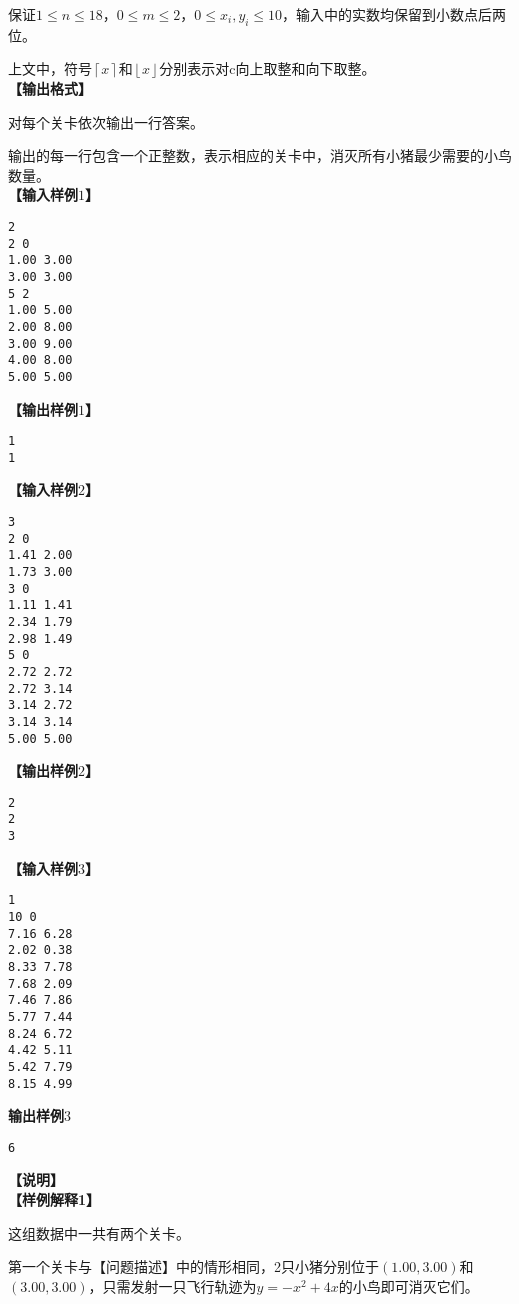 \begin{example}
保证$1\leq n\leq 18，0\leq m\leq 2，0\leq x_i,y_i\leq 10$，输入中的实数均保留到小数点后两位。

上文中，符号$\left \lceil x \right \rceil$和$\left \lfloor x \right \rfloor$分别表示对c向上取整和向下取整。\\
\textbf{【输出格式】}

对每个关卡依次输出一行答案。

输出的每一行包含一个正整数，表示相应的关卡中，消灭所有小猪最少需要的小鸟数量。\\
\textbf{【输入样例$1$】}
\begin{verbatim}
2
2 0
1.00 3.00
3.00 3.00
5 2
1.00 5.00
2.00 8.00
3.00 9.00
4.00 8.00
5.00 5.00
\end{verbatim}
\textbf{【输出样例$1$】}
\begin{verbatim}
1
1
\end{verbatim}
\textbf{【输入样例$2$】}
\begin{verbatim}
3
2 0
1.41 2.00
1.73 3.00
3 0
1.11 1.41
2.34 1.79
2.98 1.49
5 0
2.72 2.72
2.72 3.14
3.14 2.72
3.14 3.14
5.00 5.00
\end{verbatim}
\textbf{【输出样例$2$】}
\begin{verbatim}
2
2
3
\end{verbatim}
\textbf{【输入样例$3$】}
\begin{verbatim}
1
10 0
7.16 6.28
2.02 0.38
8.33 7.78
7.68 2.09
7.46 7.86
5.77 7.44
8.24 6.72
4.42 5.11
5.42 7.79
8.15 4.99
\end{verbatim}
\textbf{输出样例$3$}
\begin{verbatim}
6
\end{verbatim}
\textbf{【说明】}\\
\textbf{【样例解释1】}

这组数据中一共有两个关卡。

第一个关卡与【问题描述】中的情形相同，2只小猪分别位于$(1.00,3.00)$和$(3.00,3.00)$，只需发射一只飞行轨迹为$y = -x^2 + 4x$的小鸟即可消灭它们。


\end{example}
